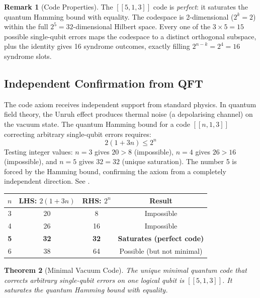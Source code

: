 \documentclass[11pt,a4paper]{article}
\newtheorem{theorem}{Theorem}[section]
\theoremstyle{definition}
\newtheorem{remark}[theorem]{Remark}
\begin{document}
\begin{remark}[Code Properties]
\label{S1:rem:code_properties}
The $[[5,1,3]]$ code is \emph{perfect}: it saturates the quantum Hamming bound with equality. The codespace is 2-dimensional ($2^k = 2$) within the full $2^5 = 32$-dimensional Hilbert space. Every one of the $3 \times 5 = 15$ possible single-qubit errors maps the codespace to a distinct orthogonal subspace, plus the identity gives 16 syndrome outcomes, exactly filling $2^{n-k} = 2^4 = 16$ syndrome slots.
\end{remark}

\subsection{Independent Confirmation from QFT}
\label{S1:sec:QFT_confirmation}

The code axiom receives independent support from standard physics. In quantum field theory, the Unruh effect produces thermal noise (a depolarising channel) on the vacuum state. The quantum Hamming bound for a code $[[n,1,3]]$ correcting arbitrary single-qubit errors requires:
\begin{equation}
2(1 + 3n) \leq 2^n
\label{S1:eq:hamming}
\end{equation}
Testing integer values: $n = 3$ gives $20 > 8$ (impossible), $n = 4$ gives $26 > 16$ (impossible), and $n = 5$ gives $32 = 32$ (unique saturation). The number 5 is forced by the Hamming bound, confirming the axiom from a completely independent direction. See \cite{Gottesman1996,Laflamme1996}.

\begin{center}
\begin{tabular}{cccc}
\toprule
$n$ & LHS: $2(1+3n)$ & RHS: $2^n$ & Result \\
\midrule
3 & 20 & 8 & Impossible \\
4 & 26 & 16 & Impossible \\
\textbf{5} & \textbf{32} & \textbf{32} & \textbf{Saturates (perfect code)} \\
6 & 38 & 64 & Possible (but not minimal) \\
\bottomrule
\end{tabular}
\end{center}

\begin{theorem}[Minimal Vacuum Code]
The unique minimal quantum code that corrects arbitrary single-qubit errors on one logical qubit is $[[5,1,3]]$. It saturates the quantum Hamming bound with equality.
\end{theorem}
\end{document}

